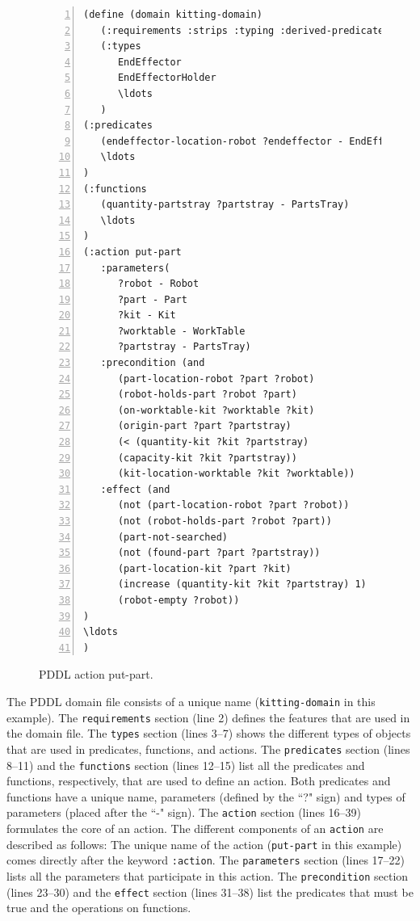 \begin{figure}[t!h!]
\centering
\begin{minipage}{.5\paperwidth}
\begin{list}{}{\setlength{\leftmargin}{1em}}\item\small
\begin{Verbatim}[commandchars=\\\{\},fontsize=\scriptsize, numbers=left, numbersep=2pt]
(define (domain kitting-domain)
   (:requirements :strips :typing :derived-predicates :action-costs :fluents)
   (:types
      EndEffector
      EndEffectorHolder
      \ldots
   )
(:predicates
   (endeffector-location-robot ?endeffector - EndEffector ?robot - Robot)	
   \ldots
)
(:functions
   (quantity-partstray ?partstray - PartsTray)
   \ldots
)
(:action put-part
   :parameters(
      ?robot - Robot
      ?part - Part
      ?kit - Kit
      ?worktable - WorkTable
      ?partstray - PartsTray)
   :precondition (and
      (part-location-robot ?part ?robot)
      (robot-holds-part ?robot ?part)
      (on-worktable-kit ?worktable ?kit)
      (origin-part ?part ?partstray)
      (< (quantity-kit ?kit ?partstray)
      (capacity-kit ?kit ?partstray))
      (kit-location-worktable ?kit ?worktable))
   :effect (and
      (not (part-location-robot ?part ?robot))
      (not (robot-holds-part ?robot ?part))
      (part-not-searched)
      (not (found-part ?part ?partstray))
      (part-location-kit ?part ?kit)
      (increase (quantity-kit ?kit ?partstray) 1)
      (robot-empty ?robot))
)
\ldots
)
\end{Verbatim}
\end{list}
\end{minipage}
\caption{PDDL action put-part.}
\label{fig:put-part}
\end{figure}
The PDDL domain file consists of a unique name (\texttt{kitting-domain} 
in this example). The \texttt{requirements} section (line 2) 
defines the features that are used in the domain file. The \texttt{types} 
section (lines 3--7) shows the different types of objects that are used 
in predicates, functions, and actions. The \texttt{predicates} section 
(lines 8--11) and the \texttt{functions} section (lines 12--15) list all 
the predicates and functions, respectively, that are used to define an action. 
Both predicates and functions have a unique name, parameters (defined by the 
``?" sign) and types of parameters (placed after the ``-" sign). The \texttt{action} 
section (lines 16--39) formulates the core of an action. The different components 
of an \texttt{action} are described as follows: The unique name of the action 
(\texttt{put-part} in this example) comes directly after the keyword \texttt{:action}. 
The \texttt{parameters} section (lines 17--22) lists all the parameters that 
participate in this action. The \texttt{precondition} section (lines 23--30) 
and the \texttt{effect} section (lines 31--38) list the predicates that must 
be true and the operations on functions.

